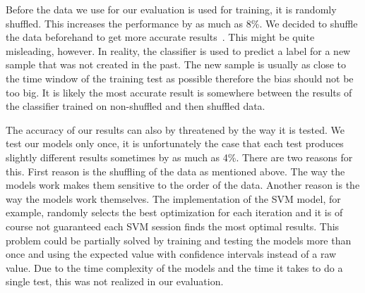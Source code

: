 Before the data we use for our evaluation is used for training, it is randomly shuffled. This increases the performance by as much as 8\%. We decided to shuffle the data beforehand to get more accurate results~. This might be quite misleading, however. In reality, the classifier is used to predict a label for a new sample that was not created in the past. The new sample is usually as close to the time window of the training test as possible therefore the bias should not be too big. It is likely the most accurate result is somewhere between the results of the classifier trained on non-shuffled and then shuffled data.

The accuracy of our results can also by threatened by the way it is tested. We test our models only once, it is unfortunately the case that each test produces slightly different results sometimes by as much as 4\%. There are two reasons for this. First reason is the shuffling of the data as mentioned above. The way the models work makes them sensitive to the order of the data. Another reason is the way the models work themselves. The implementation of the SVM model, for example, randomly selects the best optimization for each iteration and it is of course not guaranteed each SVM session finds the most optimal results. This problem could be partially solved by training and testing the models more than once and using the expected value with confidence intervals instead of a raw value. Due to the time complexity of the models and the time it takes to do a single test, this was not realized in our evaluation.